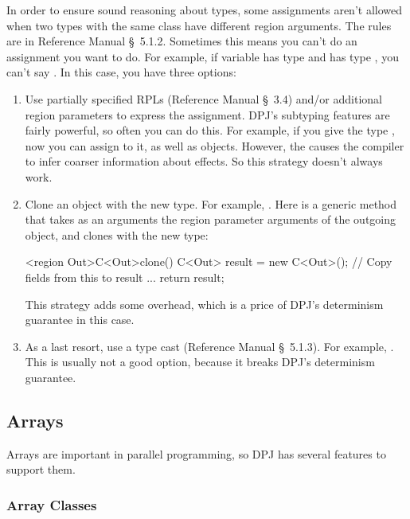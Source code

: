  In order to ensure sound reasoning
about types, some assignments aren't allowed when two types with the
same class have different region arguments.  The rules are in
Reference Manual \S~5.1.2.  Sometimes this means you can't do an
assignment you want to do.  For example, if variable  has type
 and  has type , you can't say .
In this case, you have three options:
%
\begin{enumerate}
%
\item Use partially specified RPLs (Reference Manual \S~3.4) and/or
  additional region parameters to express the assignment.  DPJ's
  subtyping features are fairly powerful, so often you can do this.
  For example, if you give  the type , now you can
  assign  to it, as well as  objects.  However, the
  \kwd{*} causes the compiler to infer coarser information about
  effects.  So this strategy doesn't always work.
%
\item Clone an object with the new type.  For example, . Here  is a generic method that takes as an
  arguments the region parameter arguments of the outgoing object, and
  clones  with the new type:
\begin{dpjlisting}
<region Out>C<Out>clone() {
    C<Out> result = new C<Out>();
    // Copy fields from this to result
    ...
    return result;
}
\end{dpjlisting}
%
This strategy adds some overhead, which is a price of DPJ's
determinism guarantee in this case.
%
\item As a last resort, use a type cast (Reference Manual
  \S~5.1.3). For example, .  This is usually not a
  good option, because it breaks DPJ's determinism guarantee.
%
\end{enumerate}

\subsection{Arrays
\label{sec:arrays}}

Arrays are important in parallel programming, so DPJ has several
features to support them.

\subsubsection{Array Classes
\label{sec:arrays:array-classes}}

